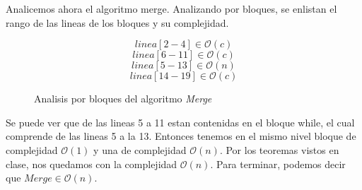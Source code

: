 \documentclass[12pt,twoside]{article}
\begin{document}
Analicemos ahora el algoritmo merge. Analizando por bloques, se enlistan el rango de las lineas de los bloques y su complejidad.
\begin{figure}[ht]
    \centering
    \begin{equation}
        linea[2-4] \in \mathcal{O}(c)
    \end{equation}
    \begin{equation}
        linea[6-11] \in \mathcal{O}(c)
    \end{equation}
    \begin{equation}
        linea[5-13] \in \mathcal{O}(n)
    \end{equation}
    \begin{equation}
        linea[14-19] \in \mathcal{O}(c)
    \end{equation}
    \caption{Analisis por bloques del algoritmo \textit{Merge}}
    \label{sec:analisis}
\end{figure}
Se puede ver que de las lineas 5 a 11 estan contenidas en el bloque while, el cual comprende de las lineas 5 a la 13. Entonces tenemos en el mismo nivel bloque de complejidad $\mathcal{O}(1)$ y una de complejidad $\mathcal{O}(n)$. Por los teoremas vistos en clase, nos quedamos con la complejidad $\mathcal{O}(n)$. Para terminar, podemos decir que $\textit{Merge} \in \mathcal{O}(n)$.
\end{document}
